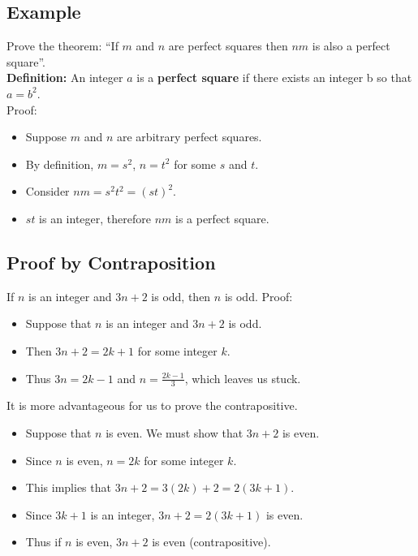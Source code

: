 \documentclass[letterpaper, 12pt]{math}
\begin{document}
\subsection*{Example}
Prove the theorem: ``If \( m \) and \( n \) are perfect squares then \( nm \)
is also a perfect square''. \\
\textbf{Definition:} An integer \( a \) is a \textbf{perfect square} if there
exists an integer b so that \( a = b^{2} \). \\
Proof:
\begin{itemize}
  \item Suppose \( m \) and \( n \) are arbitrary perfect squares.
  \item By definition, \( m = s^{2} \), \( n = t^{2} \) for some \( s \) and
    \( t \).
  \item Consider \( nm = s^{2}t^{2} = (st)^{2} \).
  \item \( st \) is an integer, therefore \( nm \) is a perfect square.
\end{itemize}

\subsection*{Proof by Contraposition}
If \( n \) is an integer and \( 3n+2 \) is odd, then \( n \) is odd. Proof:
\begin{itemize}
  \item Suppose that \( n \) is an integer and \( 3n+2 \) is odd.
  \item Then \( 3n+2 = 2k+1 \) for some integer \( k \).
  \item Thus \( 3n = 2k-1 \) and \( n = \frac{2k-1}{3} \), which leaves us
    stuck.
\end{itemize}
It is more advantageous for us to prove the contrapositive.
\begin{itemize}
  \item Suppose that \( n \) is even. We must show that \( 3n+2 \) is even.
  \item Since \( n \) is even, \( n = 2k \) for some integer \( k \).
  \item This implies that \( 3n+2 = 3(2k)+2 = 2(3k+1) \).
  \item Since \( 3k+1 \) is an integer, \( 3n+2 = 2(3k+1) \) is even.
  \item Thus if \( n \) is even, \( 3n+2 \) is even (contrapositive).
\end{itemize}
\end{document}
